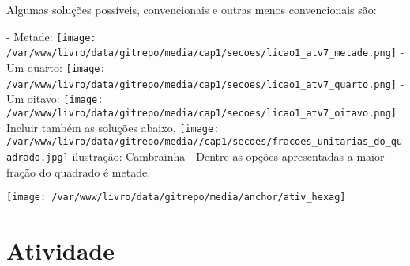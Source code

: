 \documentclass[a4paper,12pt,twoside]{book}
\begin{document}
\begin{resposta*}[breakable]{}{}  
  
  Algumas soluções possíveis, convencionais e outras menos convencionais são:  
  
        - Metade:   \mbox{} \newline        \texttt{[image: /var/www/livro/data/gitrepo/media/cap1/secoes/licao1\_atv7\_metade.png]}  
        - Um quarto:  \mbox{} \newline        \texttt{[image: /var/www/livro/data/gitrepo/media/cap1/secoes/licao1\_atv7\_quarto.png]}  
        - Um oitavo:   \mbox{} \newline        \texttt{[image: /var/www/livro/data/gitrepo/media/cap1/secoes/licao1\_atv7\_oitavo.png]}  \mbox{} \newline    Incluir também as soluções abaixo.  \mbox{} \newline        \texttt{[image: /var/www/livro/data/gitrepo/media//cap1/secoes/fracoes\_unitarias\_do\_quadrado.jpg]}  \mbox{} \newline    ilustração: Cambrainha  
        - Dentre as opções apresentadas a maior fração do quadrado é metade.  
  
  
  
\end{resposta*}



\texttt{[image: /var/www/livro/data/gitrepo/media/anchor/ativ\_hexag]}
\section{Atividade}
\end{document}
